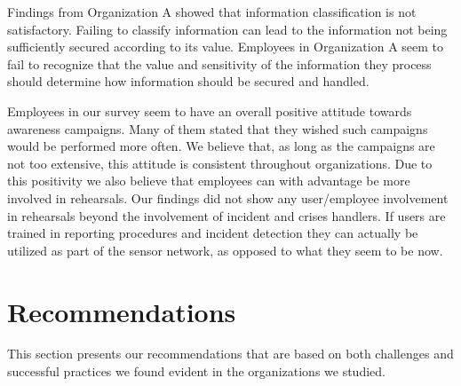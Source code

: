 Findings from Organization A showed that information classification is not satisfactory. 
Failing to classify information can lead to the information not being sufficiently secured according to its value. Employees in Organization A seem to fail to recognize that the value and sensitivity of the information they process should determine how information should be secured and handled.

Employees in our survey seem to have an overall positive attitude towards awareness campaigns. Many of them stated that they wished such campaigns would be performed more often. We believe that, as long as the campaigns are not too extensive, this attitude is consistent throughout organizations. Due to this positivity we also believe that employees can with advantage be more involved in rehearsals. Our findings did not show any user/employee involvement in rehearsals beyond the involvement of incident and crises handlers. If users are trained in reporting procedures and incident detection they can actually be utilized as part of the sensor network, as opposed to what they seem to be now.

\section{Recommendations}
\label{sec:rec}
This section presents our recommendations that are based on both challenges and successful practices  we found evident in the organizations we studied.

